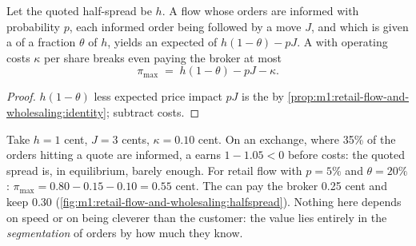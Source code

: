 \begin{proposition}\label{prop:m1:retail-flow-and-wholesaling:maxpay}
Let the quoted half-spread be $h$. A flow whose orders are informed with
probability $p$, each informed order being followed by a move $J$, and which
is given a  of a fraction $\theta$ of $h$, yields an
expected  of $h(1-\theta) - pJ$. A  with
operating costs $\kappa$ per share breaks even paying the broker at most
\[
\pi_{\max} \;=\; h(1-\theta) - pJ - \kappa .
\]
\end{proposition}
\begin{proof}
 $h(1-\theta)$ less expected price impact $pJ$ is the
 by \cref{prop:m1:retail-flow-and-wholesaling:identity};
subtract costs.
\end{proof}

\begin{example}\label{ex:m1:retail-flow-and-wholesaling:twoflows}
Take $h = 1$ cent, $J = 3$ cents, $\kappa = 0.10$ cent. On an exchange,
where 35\% of the orders hitting a quote are informed, a  earns
$1 - 1.05 < 0$ before costs: the quoted spread is, in equilibrium, barely
enough. For retail flow with $p = 5\%$ and $\theta = 20\%$: $\pi_{\max} =
0.80 - 0.15 - 0.10 = 0.55$ cent. The  can pay the broker 0.25 cent
and keep 0.30 (\cref{fig:m1:retail-flow-and-wholesaling:halfspread}). Nothing
here depends on speed or on being cleverer than the customer: the value lies
entirely in the \emph{segmentation} of orders by how much they know.
\end{example}

